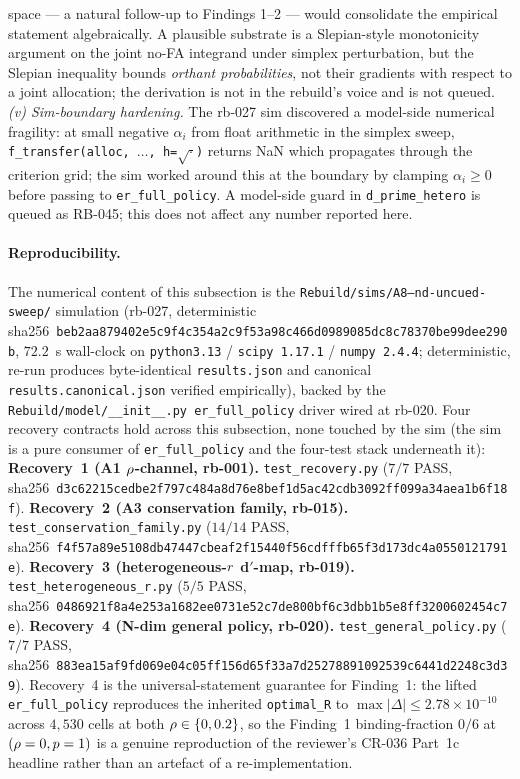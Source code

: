 space — a natural follow-up to Findings 1--2 — would consolidate the
empirical statement algebraically. A plausible substrate is a
Slepian-style monotonicity argument on the joint no-FA integrand
under simplex perturbation, but the Slepian inequality bounds
\emph{orthant probabilities}, not their gradients with respect to a
joint allocation; the derivation is not in the rebuild's voice and is
not queued. \emph{(v) Sim-boundary hardening.} The rb-027 sim
discovered a model-side numerical fragility: at small negative
$\alpha_i$ from float arithmetic in the simplex sweep,
\texttt{f\_transfer(alloc, $\ldots$, h=$\sqrt{\cdot}$)} returns NaN
which propagates through the criterion grid; the sim worked around
this at the boundary by clamping $\alpha_i \ge 0$ before passing to
\texttt{er\_full\_policy}. A model-side guard in
\texttt{d\_prime\_hetero} is queued as RB-045; this does not affect
any number reported here.

\paragraph{Reproducibility.}
The numerical content of this subsection is the
\texttt{Rebuild/sims/A8--nd-uncued-sweep/} simulation (rb-027,
deterministic sha256~\texttt{beb2aa879402e5c9f4c354a2c9f53a98c466d0989085dc8c78370be99dee290b},
$72.2$~s wall-clock on \texttt{python3.13} / \texttt{scipy 1.17.1} /
\texttt{numpy 2.4.4}; deterministic, re-run produces byte-identical
\texttt{results.json} and canonical \texttt{results.canonical.json}
verified empirically), backed by the
\texttt{Rebuild/model/\_\_init\_\_.py er\_full\_policy} driver wired
at rb-020. Four recovery contracts hold across this subsection,
none touched by the sim (the sim is a pure consumer of
\texttt{er\_full\_policy} and the four-test stack underneath it):
\textbf{Recovery~1 (A1 $\rho$-channel, rb-001).}
\texttt{test\_recovery.py} ($7/7$ PASS,
sha256~\texttt{d3c62215cedbe2f797c484a8d76e8bef1d5ac42cdb3092ff099a34aea1b6f18f}).
\textbf{Recovery~2 (A3 conservation family, rb-015).}
\texttt{test\_conservation\_family.py} ($14/14$ PASS,
sha256~\texttt{f4f57a89e5108db47447cbeaf2f15440f56cdfffb65f3d173dc4a0550121791e}).
\textbf{Recovery~3 (heterogeneous-$r$ d$'$-map, rb-019).}
\texttt{test\_heterogeneous\_r.py} ($5/5$ PASS,
sha256~\texttt{0486921f8a4e253a1682ee0731e52c7de800bf6c3dbb1b5e8ff3200602454c7e}).
\textbf{Recovery~4 (N-dim general policy, rb-020).}
\texttt{test\_general\_policy.py} ($7/7$ PASS,
sha256~\texttt{883ea15af9fd069e04c05ff156d65f33a7d25278891092539c6441d2248c3d39}).
Recovery~4 is the universal-statement guarantee for Finding~1: the
lifted \texttt{er\_full\_policy} reproduces the inherited
\texttt{optimal\_R} to $\max|\Delta| \le 2.78\!\times\!10^{-10}$
across $4{,}530$ cells at both $\rho \in \{0, 0.2\}$, so the
Finding~1 binding-fraction $0/6$ at $(\rho = 0, p = 1)$ is a
genuine reproduction of the reviewer's CR-036 Part~1c headline
rather than an artefact of a re-implementation.
